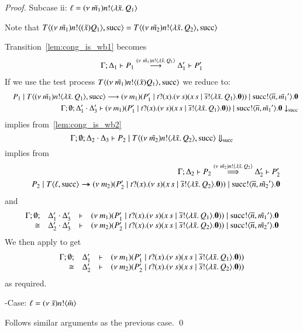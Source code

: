 \begin{proof}
	\noi Subcase ii: $\ell = (\nu\ \tilde{m_1}) n ! \langle \lambda \tilde{x}.\,Q_1 \rangle$

	\noi Note that $T\langle (\nu\ \tilde{m_1}) n ! \langle (\tilde{x}) Q_1 \rangle, \textrm{succ} \rangle = T\langle (\nu\ \tilde{m_2}) n ! \langle \lambda \tilde{x}.\,Q_2 \rangle, \textrm{succ} \rangle$

	\noi Transition~\ref{lem:cong_is_wb1} becomes
%
	\begin{eqnarray}
		\Gamma; \Delta_1 \vdash P_1 \stackrel{(\nu\ \tilde{m_1}) n ! \langle \lambda \tilde{x}.\,Q_1 \rangle}{\longrightarrow} \Delta_1' \vdash P_1'
		\label{lem:cong_is_wb3}
	\end{eqnarray}
%
	\noi If we use the test process $T\langle (\nu\ \tilde{m_1}) n ! \langle (\tilde{x}) Q_1 \rangle, \textrm{succ} \rangle$ we reduce to:%
%
	\begin{eqnarray*}
		&& P_1 \;|\; T\langle (\nu\ \tilde{m_1}) n ! \langle \lambda \tilde{x}.\,Q_1 \rangle, \textrm{succ} \rangle
		\longrightarrow
		(\nu\ m_1)(P_1' \;|\; t ? (x) . (\nu\ s)(x\,s \;|\; \overline{s} ! \langle \lambda \tilde{x}.\,Q_1 \rangle . \mathbf{0})) \;|\; \textrm{succ} ! \langle \overline{n}, \tilde{m_1}' \rangle . \mathbf{0} \\
		&& \Gamma; \emptyset; \Delta_1' \cdot \Delta_3' \vdash (\nu\ m_1)(P_1' \;|\; t ? (x) . (\nu\ s)(x\,s \;|\; \overline{s} ! \langle \lambda \tilde{x}.\,Q_1 \rangle . \mathbf{0})) \;|\; \textrm{succ} ! \langle \overline{n}, \tilde{m_1}' \rangle . \mathbf{0} \downarrow_{\textrm{succ}}
	\end{eqnarray*}
%
	\noi implies from~\ref{lem:cong_is_wb2}
%
	\[
		\Gamma; \emptyset; \Delta_2 \cdot \Delta_3 \vdash P_2 \;|\; T\langle (\nu\ \tilde{m_2}) n ! \langle \lambda \tilde{x}.\,Q_2 \rangle, \textrm{succ} \rangle \Downarrow_{\textrm{succ}}
	\]
%
	\noi implies from 
%
	\begin{eqnarray}
		&& \Gamma; \Delta_2 \vdash P_2 \stackrel{(\nu\ \tilde{m_2}) n ! \langle \lambda \tilde{x}.\,Q_2 \rangle}{\Longrightarrow} \Delta_2' \vdash P_2'
		\label{lem:cong_is_wb4}\\
		&& P_2 \;|\; T \langle \ell, \textrm{succ} \rangle \rightarrow\!\!\!\!\!\rightarrow (\nu\ m_2)(P_2' \;|\; t ? (x) . (\nu\ s)(x\,s \;|\; \overline{s} ! \langle \lambda \tilde{x}.\,Q_2 \rangle . \mathbf{0})) \;|\; \textrm{succ} ! \langle \overline{n}, \tilde{m_2}' \rangle . \mathbf{0} \nonumber
	\end{eqnarray}
%
	\noi and
%
	\[
		\begin{array}{rcll} \Gamma; \emptyset; &\Delta_1' \cdot \Delta_3'& \vdash& (\nu\ m_1)(P_1' \;|\; t ? (x) . (\nu\ s)(x\,s \;|\; \overline{s} ! \langle \lambda \tilde{x}.\,Q_1 \rangle . \mathbf{0})) \;|\; \textrm{succ} ! \langle \overline{n}, \tilde{m_1}' \rangle . \mathbf{0}\\ \cong &\Delta_2' \cdot \Delta_3'& \vdash &  (\nu\ m_2)(P_2' \;|\; t ? (x) . (\nu\ s)(x\,s \;|\; \overline{s} ! \langle \lambda \tilde{x}.\,Q_2 \rangle . \mathbf{0})) \;|\; \textrm{succ} ! \langle \overline{n}, \tilde{m_2}' \rangle . \mathbf{0} \end{array}
	\]
%
	\noi We then apply  to get
%
	\[
		\begin{array}{rcll} \Gamma; \emptyset; &\Delta_1'& \vdash& (\nu\ m_1)(P_1' \;|\; t ? (x) . (\nu\ s)(x\,s \;|\; \overline{s} ! \langle \lambda \tilde{x}.\,Q_1 \rangle . \mathbf{0}))\\ \cong &\Delta_2'& \vdash &  (\nu\ m_2)(P_2' \;|\; t ? (x) . (\nu\ s)(x\,s \;|\; \overline{s} ! \langle \lambda \tilde{x}.\,Q_2 \rangle . \mathbf{0})) \end{array}
	\]
%
	\noi as required.

	\noi -Case: $\ell = (\nu\ \tilde{s}) n ! \langle \tilde{m} \rangle$

	\noi Follows similar arguments as the previous case.
	\qed
\end{proof}

